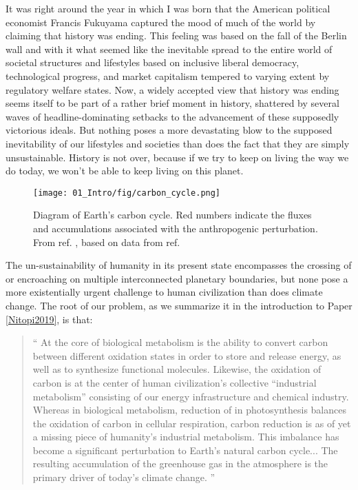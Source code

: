 It was right around the year in which I was born that the American political economist Francis Fukuyama captured the mood of much of the world by claiming that history was ending\cite{Fukuyama1992}. This feeling was based on the fall of the Berlin wall and with it what seemed like the inevitable spread to the entire world of societal structures and lifestyles based on inclusive liberal democracy, technological progress, and market capitalism tempered to varying extent by regulatory welfare states. Now, a widely accepted view that history was ending seems itself to be part of a rather brief moment in history, shattered 
by several waves of headline-dominating setbacks to the advancement of these supposedly victorious ideals.
But nothing poses a more devastating blow to the supposed inevitability of our lifestyles and societies than does the fact that they are simply unsustainable. History is not over, because if we try to keep on living the way we do today, we won't be able to keep living on this planet.

\begin{figure}[b!]
	\centering
	\texttt{[image: 01\_Intro/fig/carbon\_cycle.png]}
	\caption{Diagram of Earth's carbon cycle. Red numbers indicate the fluxes and accumulations associated with the anthropogenic perturbation. From ref. , based on data from ref. }
	\label{fig:carbon_cycle}
\end{figure}

The un-sustainability of humanity in its present state encompasses the crossing of or encroaching on multiple interconnected planetary boundaries\cite{Rockstrom2009}, but none pose a more existentially urgent challenge to human civilization than does climate change. The root of our problem, as we summarize it in the introduction to Paper \ref{Nitopi2019}, is that:

\begin{quotation}
		{\Large``} At the core of biological metabolism is the ability to convert carbon between different oxidation states in order to store and release energy, as well as to synthesize functional molecules. Likewise, the oxidation of carbon is at the center of human civilization's collective “industrial metabolism” consisting of our energy infrastructure and chemical industry. Whereas in biological metabolism, reduction of  in photosynthesis balances the oxidation of carbon in cellular respiration, carbon reduction is as of yet a missing piece of humanity's industrial metabolism. This imbalance has become a significant perturbation to Earth's natural carbon cycle... The resulting accumulation of the greenhouse gas  in the atmosphere is the primary	driver of today’s climate change\cite{IPCC2014}. {\Large''}
\end{quotation}

